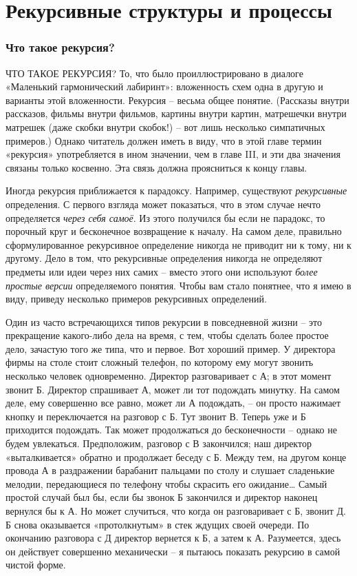 \documentclass[../main.tex]{subfiles}
\begin{document}
\chapter{Рекурсивные структуры и процессы}

\subsection{Что такое рекурсия?}

ЧТО ТАКОЕ РЕКУРСИЯ? То, что было проиллюстрировано в диалоге «Маленький гармонический лабиринт»: вложенность схем одна в другую и варианты этой вложенности. Рекурсия \--- весьма общее понятие. (Рассказы внутри рассказов, фильмы внутри фильмов, картины внутри картин, матрешечки внутри матрешек (даже скобки внутри скобок!) \--- вот лишь несколько симпатичных примеров.) Однако читатель должен иметь в виду, что в этой главе термин «рекурсия» употребляется в ином значении, чем в главе III, и эти два значения связаны только косвенно. Эта связь должна проясниться к концу главы.

Иногда рекурсия приближается к парадоксу. Например, существуют \emph{рекурсивные} определения. С первого взгляда может показаться, что в этом случае нечто определяется \emph{через себя самоё}. Из этого получился бы если не парадокс, то порочный круг и бесконечное возвращение к началу. На самом деле, правильно сформулированное рекурсивное определение никогда не приводит ни к тому, ни к другому. Дело в том, что рекурсивные определения никогда не определяют предметы или идеи через них самих \--- вместо этого они используют \emph{более простые версии} определяемого понятия. Чтобы вам стало понятнее, что я имею в виду, приведу несколько примеров рекурсивных определений.

Один из часто встречающихся типов рекурсии в повседневной жизни \--- это прекращение какого-либо дела на время, с тем, чтобы сделать более простое дело, зачастую того же типа, что и первое. Вот хороший пример. У директора фирмы на столе стоит сложный телефон, по которому ему могут звонить несколько человек одновременно. Директор разговаривает с А; в этот момент звонит Б. Директор спрашивает А, может ли тот подождать минутку. На самом деле, ему совершенно все равно, может ли А подождать, \--- он просто нажимает кнопку и переключается на разговор с Б. Тут звонит В. Теперь уже и Б приходится подождать. Так может продолжаться до бесконечности \--- однако не будем увлекаться. Предположим, разговор с В закончился; наш директор «выталкивается» обратно и продолжает беседу с Б. Между тем, на другом конце провода А в раздражении барабанит пальцами по столу и слушает сладенькие мелодии, передающиеся по телефону чтобы скрасить его ожидание\ldots{} Самый простой случай был бы, если бы звонок Б закончился и директор наконец вернулся бы к А. Но может случиться, что когда он разговаривает с Б, звонит Д. Б снова оказывается «протолкнутым» в стек ждущих своей очереди. По окончанию разговора с Д директор вернется к Б, а затем к А. Разумеется, здесь он действует совершенно механически \--- я пытаюсь показать рекурсию в самой чистой форме.
\end{document}
